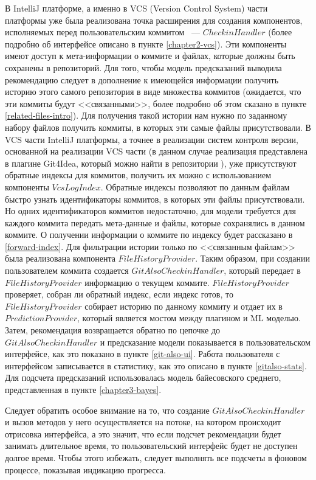 В IntelliJ платформе, а именно в VCS (Version Control System) части платформы уже была реализована точка расширения для создания компонентов, исполняемых перед пользовательским коммитом ~--- $CheckinHandler$ (более подробно об интерфейсе описано в пункте \ref{chapter2-vcs}). Эти компоненты имеют доступ к мета-информации о коммите и файлах, которые должны быть сохранены в репозиторий. Для того, чтобы модель предсказаний выводила рекомендацию следует в дополнение к имеющейся информации получить историю этого самого репозитория в виде множества коммитов (ожидается, что эти коммиты будут <<связанными>>, более подробно об этом сказано в пункте \ref{related-files-intro}). Для получения такой истории нам нужно по заданному набору файлов получить коммиты, в которых эти самые файлы присутствовали. В VCS части IntelliJ платформы, а точнее в реализации систем контроля версии, основанной на реализации VCS части (в данном случае реализация представлена в плагине Git4Idea, который можно найти в репозитории \cite{ij-community}), уже присутствуют обратные индексы для коммитов, получить их можно с использованием компоненты $VcsLogIndex$. Обратные индексы позволяют по данным файлам быстро узнать идентификаторы коммитов, в которых эти файлы присутствовали. Но одних идентификаторов коммитов недостаточно, для модели требуется для каждого коммита передать мета-данные и файлы, которые сохранялись в данном коммите. О получении информации о коммите по индексу будет рассказано в \ref{forward-index}. Для фильтрации истории только по <<связанным файлам>> была реализована компонента $FileHistoryProvider$. Таким образом, при создании пользователем коммита создается $GitAlsoCheckinHandler$, который передает в $FileHistoryProvider$ информацию о текущем коммите. $FileHistoryProvider$ проверяет, собран ли обратный индекс, если индекс готов, то $FileHistoryProvider$ собирает историю по данному коммиту и отдает их в $PredictionProvider$, который является мостом между плагином и ML моделью. Затем, рекомендация возвращается обратно по цепочке до $GitAlsoCheckinHandler$ и предсказание модели показывается в пользовательском интерфейсе, как это показано в пункте \ref{git-also-ui}. Работа пользователя с интерфейсом записывается в статистику, как это описано в пункте \ref{gitalso-stats}. Для подсчета предсказаний использовалась модель байесовского среднего, представленная в пункте \ref{chapter3-bayes}.

Следует обратить особое внимание на то, что создание $GitAlsoCheckinHandler$ и вызов методов у него осуществляется на потоке, на котором происходит отрисовка интерфейса, а это значит, что если подсчет рекомендации будет занимать длительное время, то пользовательский интерфейс будет не доступен долгое время. Чтобы этого избежать, следует выполнять все подсчеты в фоновом процессе, показывая индикацию прогресса.
